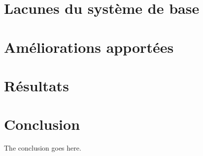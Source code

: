 \documentclass[journal]{IEEEtran}
\begin{document}
%


\section{Lacunes du système de base}

\section{Améliorations apportées}

\section{Résultats}


\section{Conclusion}
The conclusion goes here.




%
\end{document}
